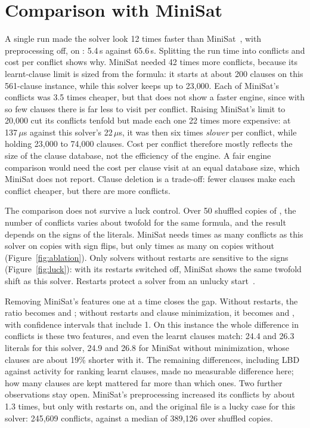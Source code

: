 \section{Comparison with MiniSat}
\label{sec:minisat}

A single run made the solver look 12 times faster than
MiniSat~\cite{een2003minisat}, with preprocessing off, on :
5.4\,s against 65.6\,s. Splitting the run time into conflicts and cost per
conflict shows why. MiniSat needed 42 times more conflicts, because its
learnt-clause limit is sized from the formula: it starts at about 200 clauses
on this 561-clause instance, while this solver keeps up to 23{,}000. Each of
MiniSat's conflicts was 3.5 times cheaper, but that does not show a faster
engine, since with so few clauses there is far less to visit per conflict.
Raising MiniSat's limit to 20{,}000 cut its conflicts tenfold but made each
one 22 times more expensive: at 137\,$\mu$s against this solver's 22\,$\mu$s,
it was then six times \emph{slower} per conflict, while holding 23{,}000 to
74{,}000 clauses. Cost per conflict therefore mostly reflects the size of the
clause database, not the efficiency of the engine. A fair engine comparison
would need the cost per clause visit at an equal database size, which MiniSat
does not report. Clause deletion is a trade-off: fewer clauses make each
conflict cheaper, but there are more conflicts.

The comparison does not survive a luck control. Over 50 shuffled copies of
, the number of conflicts varies about twofold for the same
formula, and the result depends on the signs of the literals. MiniSat needs
\numGapFlipFull{} times as many conflicts as this solver on copies with sign
flips, but only \numGapNoflipFull{} times as many on copies without
(Figure~\ref{fig:ablation}). Only solvers without restarts are sensitive to
the signs (Figure~\ref{fig:luck}): with its restarts switched off, MiniSat
shows the same twofold shift as this solver. Restarts protect a solver from an
unlucky start~\cite{gomes2000heavytails,luby1993}.

Removing MiniSat's features one at a time closes the gap. Without restarts,
the ratio becomes \numGapFlipNoRestart{} and \numGapNoflipNoRestart{}; without
restarts and clause minimization, it becomes \numGapFlipNoRestartNoMin{} and
\numGapNoflipNoRestartNoMin{}, with confidence intervals that include 1. On
this instance the whole difference in conflicts is these two features, and
even the learnt clauses match: 24.4 and 26.3 literals for this solver, 24.9
and 26.8 for MiniSat without minimization, whose clauses are about 19\%
shorter with it. The
remaining differences, including LBD against activity for ranking learnt
clauses, made no measurable difference here; how many clauses are kept
mattered far more than which ones. Two further observations stay open.
MiniSat's preprocessing increased its conflicts by about 1.3 times, but only
with restarts on, and the original  file is a lucky case for
this solver: 245{,}609 conflicts, against a median of 389{,}126 over shuffled
copies.


